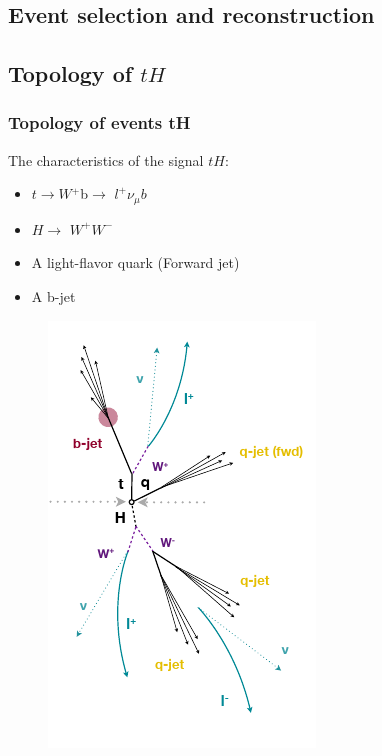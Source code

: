 \documentclass[11pt]{beamer}
\begin{document}
\begin{frame}
\section{Event selection and reconstruction}
\subsection{Topology of $tH$}
\frametitle{Topology of events tH}
The characteristics of the signal $tH$:

\begin{multicols}{2}
	\small{
\begin{itemize}
\item $t\rightarrow W$$^+$b$\rightarrow$ $l^+ \nu_\mu b$
\item $H\rightarrow$ $W^+$$W^-$ 

\item A light-flavor quark (Forward jet)
\item  A b-jet  
\end{itemize}
}
\columnbreak
\begin{figure}
	\centering
	\includegraphics[scale=0.5]{figures/jet.png}
\end{figure}
\end{multicols}
\end{frame}
\end{document}
